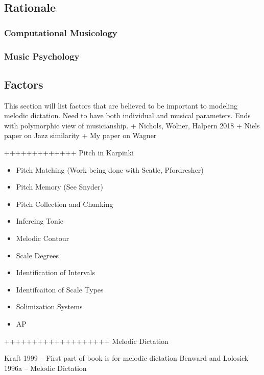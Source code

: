 \documentclass[]{book}
\providecommand{\tightlist}{%
  \setlength{\itemsep}{0pt}\setlength{\parskip}{0pt}}
\theoremstyle{definition}
\theoremstyle{definition}
\theoremstyle{definition}
\theoremstyle{remark}
\begin{document}
\hypertarget{rationale}{%
\subsection{Rationale}\label{rationale}}

\hypertarget{computational-musicology-1}{%
\subsubsection{Computational
Musicology}\label{computational-musicology-1}}

\hypertarget{music-psychology}{%
\subsubsection{Music Psychology}\label{music-psychology}}

\hypertarget{factors}{%
\subsection{Factors}\label{factors}}

This section will list factors that are believed to be important to
modeling melodic dictation. Need to have both individual and musical
parameters. Ends with polymorphic view of musicianship. + Nichols,
Wolner, Halpern 2018 + Niels paper on Jazz similarity + My paper on
Wagner

+++++++++++++ Pitch in Karpinki

\begin{itemize}
\tightlist
\item
  Pitch Matching (Work being done with Seatle, Pfordresher)
\item
  Pitch Memory (See Snyder)
\item
  Pitch Collection and Chunking
\item
  Infereing Tonic
\item
  Melodic Contour
\item
  Scale Degrees
\item
  Identification of Intervals
\item
  Identifcaiton of Scale Types
\item
  Solimization Systems
\item
  AP
\end{itemize}

+++++++++++++++++++ Melodic Dictation

Kraft 1999 -- First part of book is for melodic dictation Benward and
Lolosick 1996a -- Melodic Dictation
\end{document}
